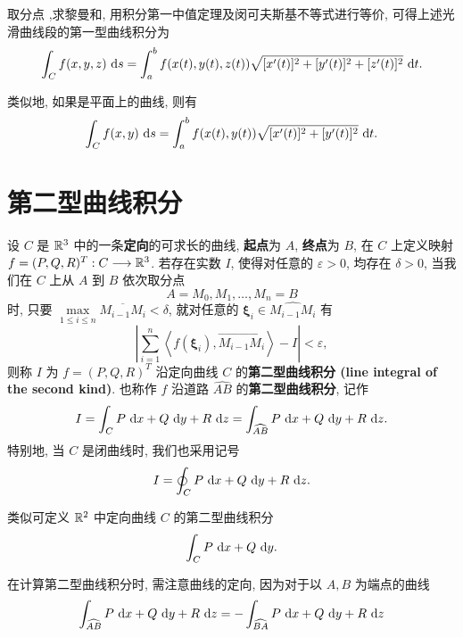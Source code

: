 取分点 ,求黎曼和, 用积分第一中值定理及闵可夫斯基不等式进行等价, 可得上述光滑曲线段的第一型曲线积分为
\begin{equation}\label{R3光滑曲线段上的第一型曲线积分}
	\int_C f(x,y,z)\ \text {d} s=\int_a^b f(x(t),y(t),z(t)) \sqrt{[x'(t)]^2+[y'(t)]^2+[z'(t)]^2} \ \text {d} t.
\end{equation}

类似地, 如果是平面上的曲线, 则有 \label{光滑曲线}
\begin{equation}\label{R2光滑曲线段上的第一型曲线积分}
	\int_C f(x,y)\ \text {d} s=\int_a^b f(x(t),y(t)) \sqrt{[x'(t)]^2+[y'(t)]^2} \ \text {d} t.
\end{equation}


\section{第二型曲线积分}

\begin{definition}\label{第二型曲线积分}
	设 $C$ 是 $\mathbb R^3$ 中的一条\textbf{定向}的可求长的曲线, \textbf{起点}为 $A$,  \textbf{终点}为 $B$, 在 $C$ 上定义映射 $f=(P,Q,R)^T:C\longrightarrow \mathbb R^3$. 若存在实数 $I$, 使得对任意的 $\varepsilon>0$, 均存在 $\delta>0$, 当我们在 $C$ 上从 $A$ 到 $B$ 依次取分点 $$A=M_0,M_1,\ldots,M_n=B$$ 时, 只要 $\max\limits_{1\leqslant i\leqslant n}\overline{M_{i-1}M_i}<\delta$, 就对任意的 $\bm\xi_i\in\widehat{M_{i-1}M_i}$ 有 $$\left|\sum\limits_{i=1}^n\left<f(\bm\xi_i),\overrightarrow{M_{i-1}M_i}\right>-I\right|<\varepsilon,$$ 则称 $I$ 为 $f=(P,Q,R)^T$ 沿定向曲线 $C$ 的\textbf{第二型曲线积分 (line integral of the second kind)}. 也称作 $f$ 沿道路 $\widehat{AB}$ 的\textbf{第二型曲线积分}, 记作 $$I=\int_C P\ \text {d} x+Q\ \text {d} y+R\ \text {d} z=\int_{\widehat{AB}}P\ \text {d} x+Q\ \text {d} y+R\ \text {d} z.$$ 特别地, 当 $C$ 是闭曲线时, 我们也采用记号 $$I=\oint_C P\ \text {d} x+Q\ \text {d} y+R\ \text {d} z.$$

	类似可定义 $\mathbb R^2$ 中定向曲线 $C$ 的第二型曲线积分 $$\int_C P\ \text {d} x+Q\ \text {d} y.$$
\end{definition}

\begin{remark}
	在计算第二型曲线积分时, 需注意曲线的定向, 因为对于以 $A,B$ 为端点的曲线 $$\int_{\widehat{AB}}P\ \text {d} x+Q\ \text {d} y+R\ \text {d} z=-\int_{\widehat{BA}}P\ \text {d} x+Q\ \text {d} y+R\ \text {d} z$$
\end{remark}



